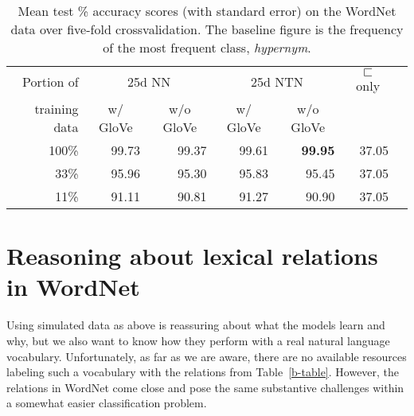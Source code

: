 \documentclass[letterpaper]{article}
\newcommand{\natfor}{\sqsubset}
\def\ii#1{\textit{#1}}
\begin{document}
\newcommand{\nodagger}{\phantom{$^\dagger$}}

\begin{table*}
\centering%
{
  \setlength{\tabcolsep}{15pt}
  \renewcommand{\arraystretch}{1.1}
  \begin{tabular}{rrrrrrr} 
    \toprule
     Portion of & \multicolumn{2}{c}{25d NN} & \multicolumn{2}{c}{25d NTN} & \multicolumn{1}{c}{$\natfor$ only}\\
     training data  & \multicolumn{1}{c}{w/ GloVe} & \multicolumn{1}{c}{w/o GloVe} & \multicolumn{1}{c}{w/ GloVe} & \multicolumn{1}{c}{w/o GloVe} \\
    \midrule
     100\%   & 99.73 & 99.37   & 99.61  & \textbf{99.95}  & 37.05 \\
     33\%    & 95.96 & 95.30    & 95.83  & 95.45  & 37.05 		\\
     11\%    & 91.11 & 90.81   & 91.27  & 90.90  & 37.05 		\\
    \bottomrule
  \end{tabular}}
 \caption{Mean test \% accuracy scores (with standard error) on the WordNet data over five-fold crossvalidation. The baseline figure is the frequency of the most frequent class, \ii{hypernym}.\label{wn-table}} 
\end{table*}

\section{Reasoning about lexical relations in WordNet}\label{sec:wordnet}

Using simulated data as above is reassuring about what the models
learn and why, but we also want to know how they perform with a real
natural language vocabulary. Unfortunately, as far as we are aware,
there are no available resources labeling such a vocabulary with the
relations from Table~\ref{b-table}. However, the relations in WordNet
\cite{fellbaum2010wordnet,WordNet95} come close and pose the same substantive
challenges within a somewhat easier classification problem.

\end{document}
